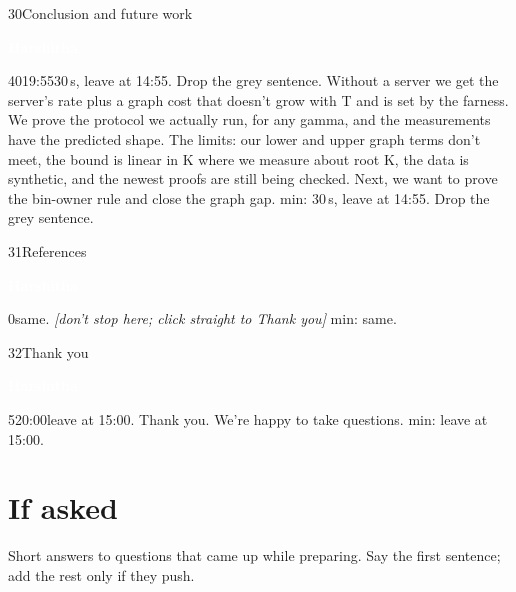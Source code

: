 \documentclass[12pt,a4paper]{article}
\newcommand{\Hb}{\colorbox{harsh}{\strut\textcolor{white}{\textbf{\small Harshitha}}}}
\newcommand{\cut}[1]{\textcolor{cutc}{#1}}
\newcommand{\cue}[1]{{\small\itshape\color{bar}[#1]}}
\newenvironment{slide}[6]
  {\begin{slidebox}{#1}{#2}{#3}{#4}{#5}{#6}\gdef\fifteen{#6}}
  {\tcblower 15 min: \fifteen\end{slidebox}}
\begin{document}
\begin{slide}{30}{Conclusion and future work}{\Hb}{40}{19:55}{30\,s, leave at 14:55. Drop the grey sentence.}
Without a server we get the server's rate plus a graph cost that doesn't grow with T and is set by the farness. We
prove the protocol we actually run, for any gamma, and the measurements have the predicted shape. The limits: our
lower and upper graph terms don't meet, the bound is linear in K where we measure about root K, the data is synthetic,
and the newest proofs are still being checked. \cut{Next, we want to prove the bin-owner rule and close the graph
gap.}
\end{slide}

\begin{slide}{31}{References}{\Hb}{0}{}{same.}
\cue{don't stop here; click straight to Thank you}
\end{slide}

\begin{slide}{32}{Thank you}{\Hb}{5}{20:00}{leave at 15:00.}
Thank you. We're happy to take questions.
\end{slide}

\newpage
\section*{If asked}
Short answers to questions that came up while preparing. Say the first sentence; add the rest only if they push.
\end{document}
